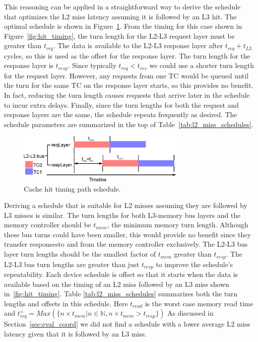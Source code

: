 This reasoning can be applied in a straightforward way to derive the schedule 
that optimizes the L2 miss latency assuming it is followed by an L3 hit.
The optimal schedule is shown in Figure~\ref{fig:hit_schedule}.
From the timing for this case shown in Figure~\ref{fig:hit_timing}, the turn
length for the L2-L3 request layer must be greater than $t_{req}$. The 
data is available to the L2-L3 response layer after $t_{req}+t_{L3}$ cycles, so 
this is used as the offset for the response layer. The turn length for the 
response layer is $t_{resp}$. Since typically $t_{req}<t_{res}$ we could use a 
shorter turn length for the request layer. However, any requests from one TC 
would be queued until the turn for the same TC on the response layer starts, so 
this provides no benefit. In fact, reducing the turn length causes requests 
that arrive later in the schedule to incur extra delays. Finally, since the 
turn lengths for both the request and response layers are the same, the 
schedule repeats frequently as desired. The schedule parameters are summarized 
in the top of Table~\ref{tab:l2_miss_schedules}.

\begin{figure}
    \begin{center}
        \includegraphics[width=3.2in]{figs/hit_schedule.eps}
        \caption{Cache hit timing path schedule.}
        \label{fig:hit_schedule}
    \end{center}
\end{figure}

Deriving a schedule that is suitable for L2 misses assuming they are followed 
by L3 misses is similar. The turn lengths for both L3-memory bus layers and
the memory controller should be $t_{mem}$, the minimum memory turn length.
Although these bus turns could have been smaller, this would provide no
benefit since they transfer responsesto and from the memory controller exclusively.
The L2-L3 bus layer turn lengths should be
the smallest factor of $t_{mem}$ greater than $t_{resp}$. The L2-L3 bus turn 
lengths are greater than just $t_{resp}$ to improve the schedule's repeatability.
Each device schedule is offset so that it starts when the data is available 
based on the timing of an L2 miss followed by an L3 miss shown 
in~\ref{fig:hit_timing}. Table \ref{tab:l2_miss_schedules} summarizes both the
turn lengths and offsets in this schedule. Here $t_{read}$ is the worst case
memory read time and
$t_{req}^+ = Max(\{n \times t_{mem} | n\in\mathbb{N}, n\times t_{mem} > t_{resp} \})$
As discussed in Section~\ref{sec:eval_coord} we did not find a schedule with 
a lower average L2 miss latency given that it is followed by an L3 miss.

